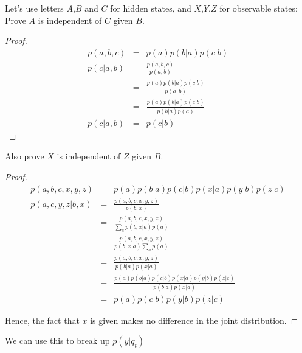 Let's use letters $A$,$B$ and $C$ for hidden states, and $X$,$Y$,$Z$ for
observable states: Prove $A$ is independent of $C$ given $B$.

\begin{figure}[!hbp]
\end{figure}


\begin{proof}
\begin{eqnarray*}
p(a,b,c) &=& p(a)p(b|a)p(c|b)\\
p(c|a,b) &=& \frac{p(a,b,c)}{p(a,b)}\\
&=& \frac{p(a)p(b|a)p(c|b)}{p(a,b)}\\
&=& \frac{p(a)p(b|a)p(c|b)}{p(b|a)p(a)}\\
p(c|a,b) &=& p(c|b)
\end{eqnarray*}
\end{proof}

Also prove $X$ is independent of $Z$ given $B$.

\begin{figure}[!hbp]
\end{figure}

\begin{proof}
\begin{eqnarray*}
p(a,b,c,x,y,z) &=& p(a)p(b|a)p(c|b)p(x|a)p(y|b)p(z|c)\\
p(a,c,y,z|b,x) &=& \frac{p(a,b,c,x,y,z)}{p(b,x)}\\
&=& \frac{p(a,b,c,x,y,z)}{\sum_a p(b,x|a)p(a)}\\
&=& \frac{p(a,b,c,x,y,z)}{ p(b,x|a)\sum_a p(a)}\\
&=& \frac{p(a,b,c,x,y,z)}{p(b|a)p(x|a)}\\
&=& \frac{p(a)p(b|a)p(c|b)p(x|a)p(y|b)p(z|c)}{p(b|a)p(x|a)}\\
&=& p(a)p(c|b)p(y|b)p(z|c)
\end{eqnarray*}

Hence, the fact that $x$ is given makes no difference in the joint distribution.

\end{proof}

We can use this to break up $p(y|q_t)$

